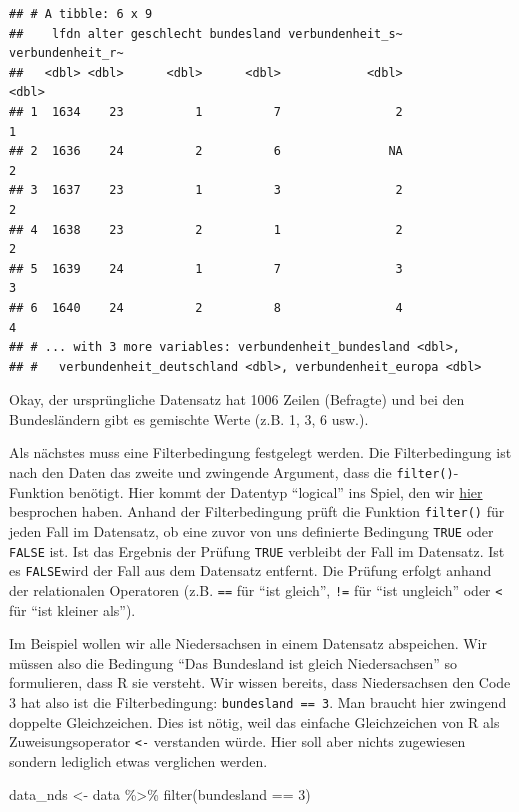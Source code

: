 \documentclass[
]{book}
\newenvironment{Shaded}{\begin{snugshade}}{\end{snugshade}}
\newcommand{\DecValTok}[1]{\textcolor[rgb]{0.00,0.00,0.81}{#1}}
\newcommand{\FunctionTok}[1]{\textcolor[rgb]{0.00,0.00,0.00}{#1}}
\newcommand{\NormalTok}[1]{#1}
\newcommand{\OtherTok}[1]{\textcolor[rgb]{0.56,0.35,0.01}{#1}}
\newcommand{\SpecialCharTok}[1]{\textcolor[rgb]{0.00,0.00,0.00}{#1}}
\begin{document}
\begin{verbatim}
## # A tibble: 6 x 9
##    lfdn alter geschlecht bundesland verbundenheit_s~ verbundenheit_r~
##   <dbl> <dbl>      <dbl>      <dbl>            <dbl>            <dbl>
## 1  1634    23          1          7                2                1
## 2  1636    24          2          6               NA                2
## 3  1637    23          1          3                2                2
## 4  1638    23          2          1                2                2
## 5  1639    24          1          7                3                3
## 6  1640    24          2          8                4                4
## # ... with 3 more variables: verbundenheit_bundesland <dbl>,
## #   verbundenheit_deutschland <dbl>, verbundenheit_europa <dbl>
\end{verbatim}

Okay, der ursprüngliche Datensatz hat 1006 Zeilen (Befragte) und bei den Bundesländern gibt es gemischte Werte (z.B. 1, 3, 6 usw.).

Als nächstes muss eine Filterbedingung festgelegt werden. Die Filterbedingung ist nach den Daten das zweite und zwingende Argument, dass die \texttt{filter()}-Funktion benötigt. Hier kommt der Datentyp ``logical'' ins Spiel, den wir \protect\hyperlink{atomic_vector_types}{hier} besprochen haben. Anhand der Filterbedingung prüft die Funktion \texttt{filter()} für jeden Fall im Datensatz, ob eine zuvor von uns definierte Bedingung \texttt{TRUE} oder \texttt{FALSE} ist. Ist das Ergebnis der Prüfung \texttt{TRUE} verbleibt der Fall im Datensatz. Ist es \texttt{FALSE}wird der Fall aus dem Datensatz entfernt. Die Prüfung erfolgt anhand der relationalen Operatoren (z.B. \texttt{==} für ``ist gleich'', \texttt{!=} für ``ist ungleich'' oder \texttt{\textless{}} für ``ist kleiner als'').

Im Beispiel wollen wir alle Niedersachsen in einem Datensatz abspeichen. Wir müssen also die Bedingung ``Das Bundesland ist gleich Niedersachsen'' so formulieren, dass R sie versteht. Wir wissen bereits, dass Niedersachsen den Code 3 hat also ist die Filterbedingung: \texttt{bundesland\ ==\ 3}. Man braucht hier zwingend doppelte Gleichzeichen. Dies ist nötig, weil das einfache Gleichzeichen von R als Zuweisungsoperator \texttt{\textless{}-} verstanden würde. Hier soll aber nichts zugewiesen sondern lediglich etwas verglichen werden.

\begin{Shaded}
\begin{Highlighting}[]
\NormalTok{data\_nds }\OtherTok{\textless{}{-}}\NormalTok{ data }\SpecialCharTok{\%\textgreater{}\%} 
  \FunctionTok{filter}\NormalTok{(bundesland }\SpecialCharTok{==} \DecValTok{3}\NormalTok{)}
\end{Highlighting}
\end{Shaded}
\end{document}
